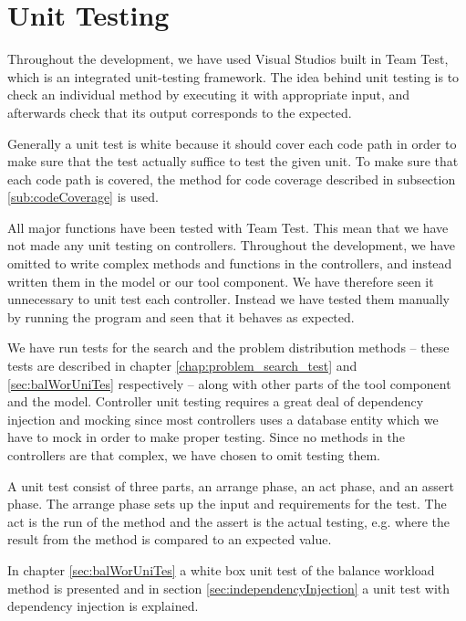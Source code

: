 \section{Unit Testing}
\label{chap:testing}
Throughout the development, we have used Visual Studios built in Team Test, which is an integrated unit-testing framework. \cite{teamtest}
The idea behind unit testing is to check an individual method by executing it with appropriate input, and afterwards check that its output corresponds to the expected.

Generally a unit test is white because it should cover each code path in order to make sure that the test actually suffice to test the given unit. \cite[p.~39]{williams06}
To make sure that each code path is covered, the method for code coverage described in subsection \ref{sub:codeCoverage} is used.

All major functions have been tested with Team Test. This mean that we have not made any unit testing on controllers. 
Throughout the development, we have omitted to write complex methods and functions in the controllers, and instead written them in the model or our tool component. We have therefore seen it unnecessary to unit test each controller. Instead we have tested them manually by running the program and seen that it behaves as expected. 

We have run tests for the search and the problem distribution methods -- these tests are described in chapter \ref{chap:problem_search_test} and \ref{sec:balWorUniTes} respectively -- along with other parts of the tool component and the model.
Controller unit testing requires a great deal of dependency injection and mocking since most controllers uses a database entity which we have to mock in order to make proper testing.
Since no methods in the controllers are that complex, we have chosen to omit testing them.

A unit test consist of three parts, an arrange phase, an act phase, and an assert phase. 
The arrange phase sets up the input and requirements for the test. 
The act is the run of the method and the assert is the actual testing, e.g. where the result from the method is compared to an expected value.  

In chapter \ref{sec:balWorUniTes} a white box unit test of the balance workload method is presented and in section \ref{sec:independencyInjection} a unit test with dependency injection is explained. 